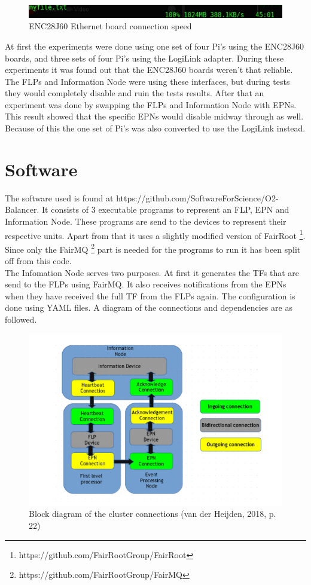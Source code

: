 \begin{figure}[htb]
	\includegraphics[scale=0.6]{./graphics/gpio_ethernet_speed.jpg}
	\caption{ENC28J60 Ethernet board connection speed}
\end{figure}

At first the experiments were done using one set of four Pi's using the ENC28J60 boards, and three sets of four Pi's using the LogiLink adapter. During these experiments it was found out that the ENC28J60 boards weren't that reliable. The FLPs and Information Node were using these interfaces, but during tests they would completely disable and ruin the tests results. After that an experiment was done by swapping the FLPs and Information Node with EPNs. This result showed that the specific EPNs would disable midway through as well. Because of this the one set of Pi's was also converted to use the LogiLink instead.

\section{Software}
The software used is found at https://github.com/SoftwareForScience/O2-Balancer. It consists of 3 executable programs to represent an FLP, EPN and Information Node. These programs are send to the devices to represent their respective units. Apart from that it uses a slightly modified version of FairRoot
\footnote{https://github.com/FairRootGroup/FairRoot}. 
Since only the FairMQ
\footnote{https://github.com/FairRootGroup/FairMQ}
 part is needed for the programs to run it has been split off from this code.\\
The Infomation Node serves two purposes. At first it generates the TFs that are send to the FLPs using FairMQ. It also receives notifications from the EPNs when they have received the full TF from the FLPs again. The configuration is done using YAML files. A diagram of the connections and dependencies are as followed.

\begin{figure}[htb]
    \centering
    \includegraphics[scale=0.7]{./graphics/connection_diagram.png}
    \caption{Block diagram of the cluster connections (van der Heijden, 2018, p. 22)}
\end{figure}

